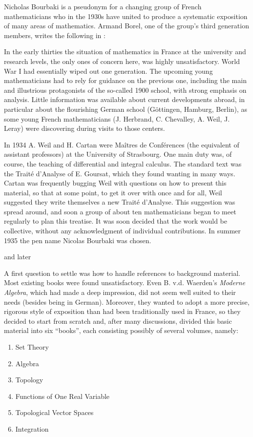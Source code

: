 \begin{remark}\label{rem:bourbaki}
  Nicholas Bourbaki is a pseudonym for a changing group of French mathematicians who in the 1930s have united to produce a systematic exposition of many areas of mathematics. Armand Borel, one of the group's third generation members, writes the following in \cite[1]{Borel1998Bourbaki}:
  \begin{displayquote}
    In the early thirties the situation of mathematics in France at the university and research levels, the only ones of concern here, was highly unsatisfactory. World War I had essentially wiped out one generation. The upcoming young mathematicians had to rely for guidance on the previous one, including the main and illustrious protagonists of the so-called 1900 school, with strong emphasis on analysis. Little information was available about current developments abroad, in particular about the flourishing German school (Göttingen, Hamburg, Berlin), as some young French mathematicians (J. Herbrand, C. Chevalley, A. Weil, J. Leray) were discovering during visits to those centers.

    In 1934 A. Weil and H. Cartan were Ma\^itres de Conf\'erences (the equivalent of assistant professors) at the University of Strasbourg. One main duty was, of course, the teaching of differential and integral calculus. The standard text was the Trait\'e d'Analyse of E. Goursat, which they found wanting in many ways. Cartan was frequently bugging Weil with questions on how to present this material, so that at some point, to get it over with once and for all, Weil suggested they write themselves a new Trait\'e d'Analyse. This suggestion was spread around, and soon a group of about ten mathematicians began to meet regularly to plan this treatise. It was soon decided that the work would be collective, without any acknowledgment of individual contributions. In summer 1935 the pen name Nicolas Bourbaki was chosen.
  \end{displayquote}
  and later
  \begin{displayquote}
    A first question to settle was how to handle references to background material. Most existing books were found unsatisfactory. Even B. v.d. Waerden's \textit{Moderne Algebra}, which had made a deep impression, did not seem well suited to their needs (besides being in German). Moreover, they wanted to adopt a more precise, rigorous style of exposition than had been traditionally used in France, so they decided to start from scratch and, after many discussions, divided this basic material into six \enquote{books}, each consisting possibly of several volumes, namely:
    \begin{enumerate}[label=\Roman*]
      \item Set Theory
      \item Algebra
      \item Topology
      \item Functions of One Real Variable
      \item Topological Vector Spaces
      \item Integration
    \end{enumerate}


\end{displayquote}
\end{remark}
